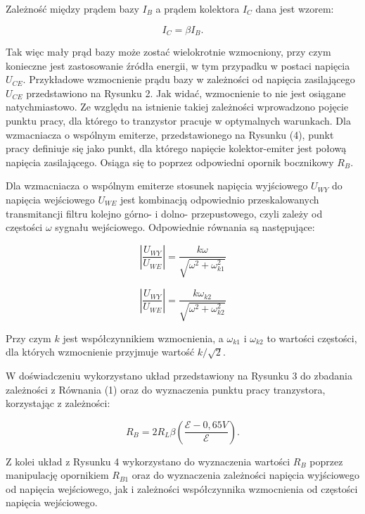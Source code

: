 \documentclass[10pt,a4paper]{article}
\begin{document}
Zależność między prądem bazy $I_{B}$ a prądem kolektora $I_{C}$ dana jest wzorem:

\begin{equation}
I_{C}=\beta I_{B}.
\end{equation}

Tak więc mały prąd bazy może zostać wielokrotnie wzmocniony, przy czym konieczne jest zastosowanie źródła energii, w tym przypadku w postaci napięcia $U_{CE}$. Przykładowe wzmocnienie prądu bazy w zależności od napięcia zasilającego $U_{CE}$ przedstawiono na Rysunku 2. Jak widać, wzmocnienie to nie jest osiągane natychmiastowo. Ze względu na istnienie takiej zależności wprowadzono pojęcie punktu pracy, dla którego to tranzystor pracuje w optymalnych warunkach. Dla wzmacniacza o wspólnym emiterze, przedstawionego na Rysunku (4), punkt pracy definiuje się jako punkt, dla którego napięcie kolektor-emiter jest połową napięcia zasilającego. Osiąga się to poprzez odpowiedni opornik bocznikowy $R_{B}$.


 Dla wzmacniacza o wspólnym emiterze stosunek napięcia wyjściowego $U_{WY}$ do napięcia wejściowego $U_{WE}$ jest kombinacją odpowiednio przeskalowanych transmitancji filtru kolejno górno- i dolno- przepustowego, czyli zależy od częstości $\omega$ sygnału wejściowego. Odpowiednie równania są następujące:
 
 \begin{equation}
 \left|\dfrac{U_{WY}}{U_{WE}}\right|=\dfrac{k\omega}{\sqrt{\omega^2+\omega_{k1}^2}}
 \end{equation}
 
  \begin{equation}
  \left|\dfrac{U_{WY}}{U_{WE}}\right|=\dfrac{k\omega_{k2}}{\sqrt{\omega^2+\omega_{k2}^2}}
 \end{equation}

Przy czym $k$ jest współczynnikiem wzmocnienia, a $\omega_{k1}$ i $\omega_{k2}$ to wartości częstości, dla których wzmocnienie przyjmuje wartość $k/\sqrt{2}$.

W doświadczeniu wykorzystano układ przedstawiony na Rysunku 3 do zbadania zależności z Równania (1) oraz do wyznaczenia punktu pracy tranzystora, korzystając z zależności:

\begin{equation}
R_{B}=2R_{L}\beta\left(\dfrac{\mathcal{E}-0,65V}{\mathcal{E}}\right).
\end{equation}

Z kolei układ z Rysunku 4 wykorzystano do wyznaczenia wartości $R_{B}$ poprzez manipulację  opornikiem $R_{B1}$ oraz do wyznaczenia zależności napięcia wyjściowego od napięcia wejściowego, jak i zależności współczynnika wzmocnienia od częstości napięcia wejściowego.
\end{document}
